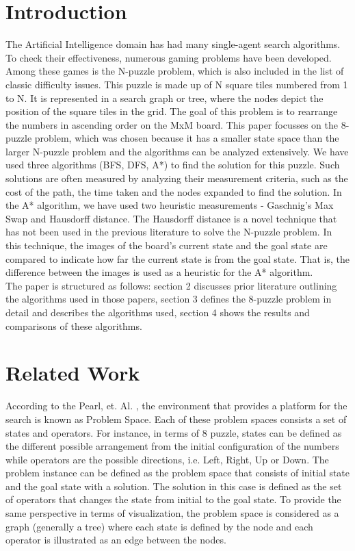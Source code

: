 \documentclass{svproc}
\begin{document}
\section{Introduction}
\noindent The Artificial Intelligence domain has had many single-agent search algorithms. To check their effectiveness, numerous gaming problems have been developed. Among these games is the N-puzzle problem, which is also included in the list of classic difficulty issues. This puzzle is made up of N square tiles numbered from 1 to N. It is represented in a search graph or tree, where the nodes depict the position of the square tiles in the grid. The goal of this problem is to rearrange the numbers in ascending order on the MxM board. This paper focusses on the 8-puzzle problem, which was chosen because it has a smaller state space than the larger N-puzzle problem and the algorithms can be analyzed extensively. We have used three algorithms (BFS, DFS, A*) to find the solution for this puzzle. Such solutions are often measured by analyzing their measurement criteria, such as the cost of the path, the time taken and the nodes expanded to find the solution. In the A* algorithm, we have used two heuristic measurements - Gaschnig’s Max Swap and Hausdorff distance. The Hausdorff distance is a novel technique that has not been used in the previous literature to solve the N-puzzle problem. In this technique, the images of the board's current state and the goal state are compared to indicate how far the current state is from the goal state. That is, the difference between the images is used as a heuristic for the A* algorithm. \\

\noindent The paper is structured as follows: section 2 discusses prior literature outlining the algorithms used in those papers,  section 3 defines the 8-puzzle problem in detail and describes the algorithms used, section 4 shows the results and comparisons of these algorithms.

\section{Related Work}
\noindent According to the Pearl, et. Al. , the environment that provides a platform for the search is known as Problem Space. Each of these problem spaces consists a set of states and operators. For instance, in terms of 8 puzzle, states can be defined as the different possible arrangement from the initial configuration of the numbers while operators are the possible directions, i.e. Left, Right, Up or Down. The problem instance can be defined as the problem space that consists of initial state and the goal state with a solution. The solution in this case is defined as the set of operators that changes the state from initial to the goal state. To provide the same perspective in terms of visualization, the problem space is considered as a graph (generally a tree) where each state is defined by the node and each operator is illustrated as an edge between the nodes. \\
\end{document}
